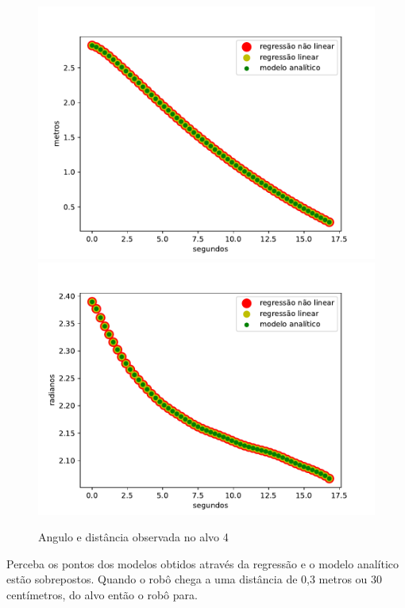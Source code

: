 \begin{figure}[H]
    \centering
    \includegraphics[scale=0.45]{figuras/distance_over_time_4.pdf}
    \includegraphics[scale=0.45]{figuras/angle_over_time_4.pdf}
    \caption{Angulo e distância observada no alvo 4}
\end{figure}

Perceba os pontos dos modelos obtidos através da regressão e o modelo analítico
estão sobrepostos. Quando o robô chega a uma distância de 0,3 metros ou 30 centímetros,
do alvo então o robô para.

